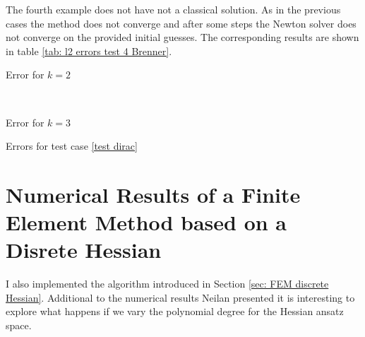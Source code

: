 The fourth example does not have not a classical solution. As in the previous cases the method does not converge and after some steps the Newton solver does not converge on the provided initial guesses. The corresponding results are shown in table \ref{tab: l2 errors test 4 Brenner}.

\begin{table}[h]
	\begin{subtable}[b]{0.45\textwidth}
		\centering
		\pgfplotstabletypeset[columns={iterations, l2error, h1error,N},
				    every row 0 column 0/.style={set content=init},
				    columns/l2error/.style={ /pgf/number format/sci precision=6}     %
		]\MAFourBrennerTwo
    	\caption{Error for $k=2$}
   \end{subtable}
   ~
	\begin{subtable}[b]{0.45\textwidth}
		\centering
		\pgfplotstabletypeset[columns={iterations, l2error, h1error,N},
				    every row 0 column 0/.style={set content=init},
		]\MAFourBrennerThree
 	\caption{Error for $k=3$}
	\end{subtable}
	\caption{Errors for test case \ref{test dirac}}
	\label{tab: l2 errors test 4 Brenner}
\end{table}

\newpage
\section{Numerical Results of a Finite Element Method based on a Disrete Hessian}

I also implemented the algorithm introduced in Section \ref{sec: FEM discrete Hessian}.
Additional to the numerical results Neilan presented it is interesting to explore what happens if we vary the polynomial degree for the Hessian ansatz space. 

